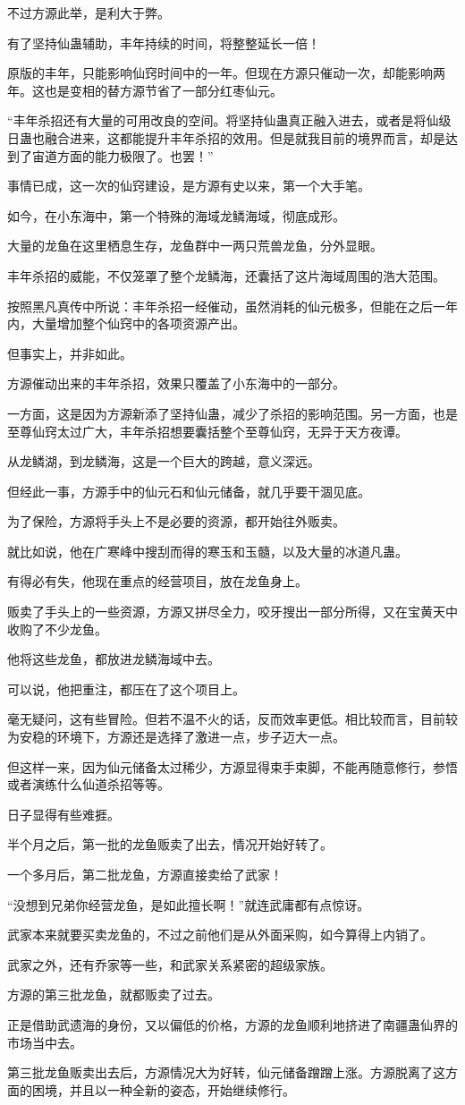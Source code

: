 \begin{this_body}
不过方源此举，是利大于弊。

有了坚持仙蛊辅助，丰年持续的时间，将整整延长一倍！

原版的丰年，只能影响仙窍时间中的一年。但现在方源只催动一次，却能影响两年。这也是变相的替方源节省了一部分红枣仙元。

“丰年杀招还有大量的可用改良的空间。将坚持仙蛊真正融入进去，或者是将仙级日蛊也融合进来，这都能提升丰年杀招的效用。但是就我目前的境界而言，却是达到了宙道方面的能力极限了。也罢！”

事情已成，这一次的仙窍建设，是方源有史以来，第一个大手笔。

如今，在小东海中，第一个特殊的海域龙鳞海域，彻底成形。

大量的龙鱼在这里栖息生存，龙鱼群中一两只荒兽龙鱼，分外显眼。

丰年杀招的威能，不仅笼罩了整个龙鳞海，还囊括了这片海域周围的浩大范围。

按照黑凡真传中所说：丰年杀招一经催动，虽然消耗的仙元极多，但能在之后一年内，大量增加整个仙窍中的各项资源产出。

但事实上，并非如此。

方源催动出来的丰年杀招，效果只覆盖了小东海中的一部分。

一方面，这是因为方源新添了坚持仙蛊，减少了杀招的影响范围。另一方面，也是至尊仙窍太过广大，丰年杀招想要囊括整个至尊仙窍，无异于天方夜谭。

从龙鳞湖，到龙鳞海，这是一个巨大的跨越，意义深远。

但经此一事，方源手中的仙元石和仙元储备，就几乎要干涸见底。

为了保险，方源将手头上不是必要的资源，都开始往外贩卖。

就比如说，他在广寒峰中搜刮而得的寒玉和玉髓，以及大量的冰道凡蛊。

有得必有失，他现在重点的经营项目，放在龙鱼身上。

贩卖了手头上的一些资源，方源又拼尽全力，咬牙搜出一部分所得，又在宝黄天中收购了不少龙鱼。

他将这些龙鱼，都放进龙鳞海域中去。

可以说，他把重注，都压在了这个项目上。

毫无疑问，这有些冒险。但若不温不火的话，反而效率更低。相比较而言，目前较为安稳的环境下，方源还是选择了激进一点，步子迈大一点。

但这样一来，因为仙元储备太过稀少，方源显得束手束脚，不能再随意修行，参悟或者演练什么仙道杀招等等。

日子显得有些难捱。

半个月之后，第一批的龙鱼贩卖了出去，情况开始好转了。

一个多月后，第二批龙鱼，方源直接卖给了武家！

“没想到兄弟你经营龙鱼，是如此擅长啊！”就连武庸都有点惊讶。

武家本来就要买卖龙鱼的，不过之前他们是从外面采购，如今算得上内销了。

武家之外，还有乔家等一些，和武家关系紧密的超级家族。

方源的第三批龙鱼，就都贩卖了过去。

正是借助武遗海的身份，又以偏低的价格，方源的龙鱼顺利地挤进了南疆蛊仙界的市场当中去。

第三批龙鱼贩卖出去后，方源情况大为好转，仙元储备蹭蹭上涨。方源脱离了这方面的困境，并且以一种全新的姿态，开始继续修行。

\end{this_body}

